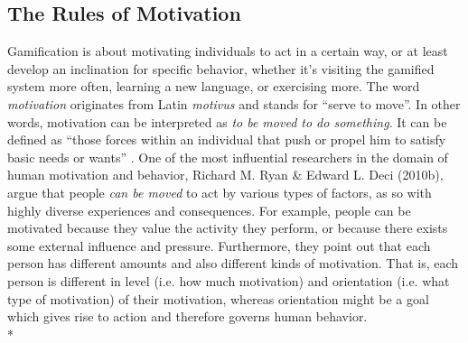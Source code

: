 \subsection{The Rules of Motivation}
Gamification is about motivating  individuals to act in a certain way, or at least develop an inclination for specific behavior,  whether  it's  visiting  the gamified  system  more  often,  learning a new language, or exercising more. 
The word \textit{motivation} originates from Latin \textit{motivus} and stands for ``serve to move''. In other words, motivation can be interpreted as \textit{to be moved to do something}. It can be defined as ``those forces within an individual that push or propel him to satisfy basic needs or wants'' \cite{pardee1990motivation}. One of the most influential researchers in the domain of human motivation and behavior, Richard M. Ryan \& Edward L. Deci (2010b), argue that people \textit{can be moved} to act by various types of factors, as so with highly diverse experiences and consequences. For example, people can be motivated because they value the activity they perform, or because there exists some external influence and pressure. Furthermore, they point out that each person has different amounts and also different kinds of motivation. That is, each person is different in level (i.e. how much motivation) and orientation (i.e. what type of motivation) of their motivation, whereas orientation might be a goal which gives rise to action and therefore governs human behavior. \\*

